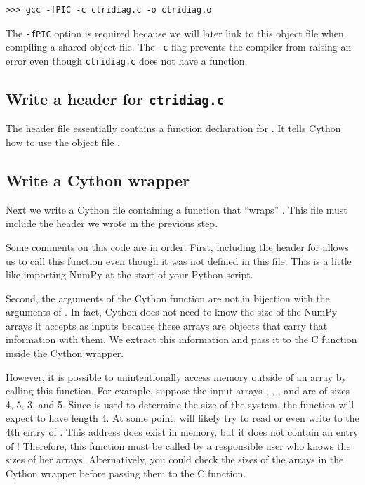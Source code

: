 \begin{lstlisting}
>>> gcc -fPIC -c ctridiag.c -o ctridiag.o
\end{lstlisting}
The \texttt{-fPIC} option is required because we will later link to this object file when compiling a shared object file.
The \texttt{-c} flag prevents the compiler from raising an error even though \texttt{ctridiag.c} does not have a  function.




\subsection*{Write a header for \texttt{ctridiag.c}}

The header file essentially contains a function declaration for .
It tells Cython how to use the object file .


\subsection*{Write a Cython wrapper}
Next we write a Cython file containing a function that ``wraps'' .
This file must include the header we wrote in the previous step.



Some comments on this code are in order. 
First, including the header for  allows us to call this function even though it was not defined in this file.
This is a little like importing NumPy at the start of your Python script.

Second, the arguments of the Cython function  are not in bijection with the arguments of .
In fact, Cython does not need to know the size of the NumPy arrays it accepts as inputs because these arrays are objects that carry that information with them.
We extract this information and pass it to the C function inside the Cython wrapper.

However, it is possible to unintentionally access memory outside of an array by calling this function.
For example, suppose the input arrays , , , and  are of sizes 4, 5, 3, and 5.
Since  is used to determine the size of the system, the function  will expect  to have length 4.
At some point,  will likely try to read or even write to the 4th entry of .
This address does exist in memory, but it does not contain an entry of !
Therefore, this function must be called by a responsible user who knows the sizes of her arrays.
Alternatively, you could check the sizes of the arrays in the Cython wrapper before passing them to the C function.

